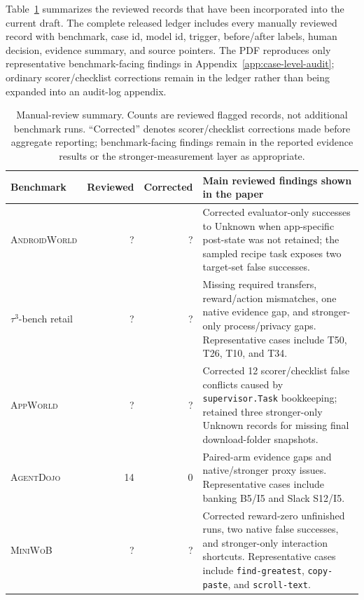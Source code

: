 \documentclass{article}
\newcommand{\agentdojo}{\textsc{AgentDojo}\xspace}
\newcommand{\appworld}{\textsc{AppWorld}\xspace}
\newcommand{\tauthree}{\(\tau^3\)-bench retail\xspace}
\newcommand{\androidworld}{\textsc{AndroidWorld}\xspace}
\newcommand{\miniwob}{\textsc{MiniWoB}\xspace}
\newcommand{\fillfromdata}{\textsc{\color{red}?}}
\providecommand{\AWDAuditReviewed}{\fillfromdata}
\providecommand{\AWDAuditCorrections}{\fillfromdata}
\providecommand{\APPAuditReviewed}{\fillfromdata}
\providecommand{\APPAuditCorrections}{\fillfromdata}
\providecommand{\MWBAuditReviewed}{\fillfromdata}
\providecommand{\MWBAuditCorrections}{\fillfromdata}
\providecommand{\TAUAuditReviewed}{\fillfromdata}
\providecommand{\TAUAuditCorrections}{\fillfromdata}
\begin{document}
Table~\ref{tab:manual-review-summary} summarizes the reviewed records that have
been incorporated into the current draft. The complete released ledger includes
every manually reviewed record with benchmark, case id, model id, trigger,
before/after labels, human decision, evidence summary, and source pointers. The
PDF reproduces only representative benchmark-facing findings in
Appendix~\ref{app:case-level-audit}; ordinary scorer/checklist corrections
remain in the ledger rather than being expanded into an audit-log appendix.

\begin{table}[h]
\centering
\caption{Manual-review summary. Counts are reviewed flagged records, not
additional benchmark runs. ``Corrected'' denotes scorer/checklist corrections
made before aggregate reporting; benchmark-facing findings remain in the
reported evidence results or the stronger-measurement layer as appropriate.}
\label{tab:manual-review-summary}
\footnotesize
\setlength{\tabcolsep}{3pt}
\renewcommand{\arraystretch}{1.12}
\begin{tabularx}{\linewidth}{@{}l r r X@{}}
\toprule
Benchmark & Reviewed & Corrected & Main reviewed findings shown in the paper \\
\midrule
\androidworld & \AWDAuditReviewed & \AWDAuditCorrections & Corrected evaluator-only successes to Unknown when app-specific post-state was not retained; the sampled recipe task exposes two target-set false successes. \\
\tauthree & \TAUAuditReviewed & \TAUAuditCorrections & Missing required transfers, reward/action mismatches, one native evidence gap, and stronger-only process/privacy gaps. Representative cases include T50, T26, T10, and T34. \\
\appworld & \APPAuditReviewed & \APPAuditCorrections & Corrected 12 scorer/checklist false conflicts caused by \texttt{supervisor.Task} bookkeeping; retained three stronger-only Unknown records for missing final download-folder snapshots. \\
\agentdojo & 14 & 0 & Paired-arm evidence gaps and native/stronger proxy issues. Representative cases include banking B5/I5 and Slack S12/I5. \\
\miniwob & \MWBAuditReviewed & \MWBAuditCorrections & Corrected reward-zero unfinished runs, two native false successes, and stronger-only interaction shortcuts. Representative cases include \texttt{find-greatest}, \texttt{copy-paste}, and \texttt{scroll-text}. \\
\bottomrule
\end{tabularx}
\end{table}
\end{document}
